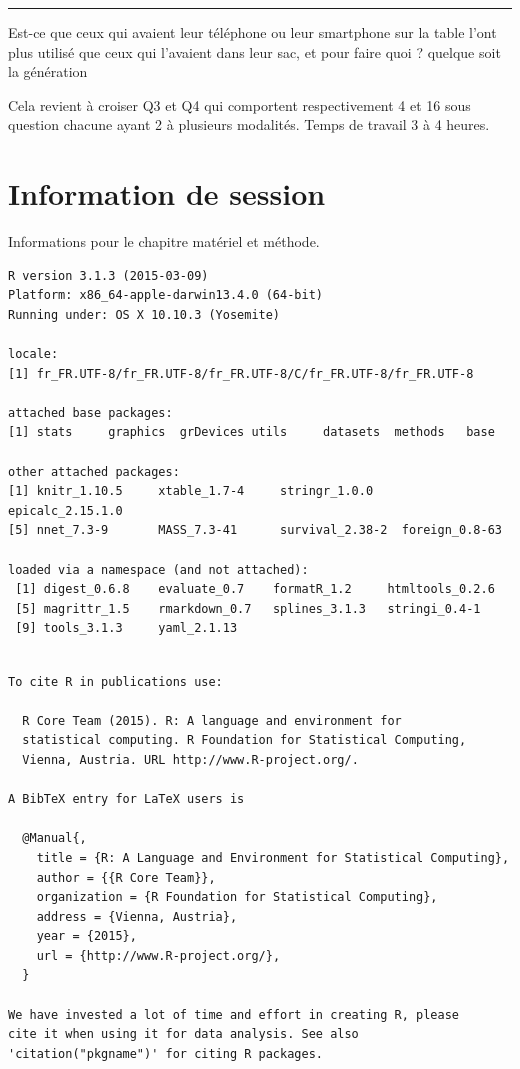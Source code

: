 \documentclass[]{article}
\begin{document}
\begin{center}\rule{3in}{0.4pt}\end{center}

Est-ce que ceux qui avaient leur téléphone ou leur smartphone sur la
table l'ont plus utilisé que ceux qui l'avaient dans leur sac, et pour
faire quoi ? quelque soit la génération

Cela revient à croiser Q3 et Q4 qui comportent respectivement 4 et 16
sous question chacune ayant 2 à plusieurs modalités. Temps de travail 3
à 4 heures.

\section{Information de session}\label{information-de-session}

Informations pour le chapitre matériel et méthode.

\begin{verbatim}
R version 3.1.3 (2015-03-09)
Platform: x86_64-apple-darwin13.4.0 (64-bit)
Running under: OS X 10.10.3 (Yosemite)

locale:
[1] fr_FR.UTF-8/fr_FR.UTF-8/fr_FR.UTF-8/C/fr_FR.UTF-8/fr_FR.UTF-8

attached base packages:
[1] stats     graphics  grDevices utils     datasets  methods   base     

other attached packages:
[1] knitr_1.10.5     xtable_1.7-4     stringr_1.0.0    epicalc_2.15.1.0
[5] nnet_7.3-9       MASS_7.3-41      survival_2.38-2  foreign_0.8-63  

loaded via a namespace (and not attached):
 [1] digest_0.6.8    evaluate_0.7    formatR_1.2     htmltools_0.2.6
 [5] magrittr_1.5    rmarkdown_0.7   splines_3.1.3   stringi_0.4-1  
 [9] tools_3.1.3     yaml_2.1.13    
\end{verbatim}

\begin{verbatim}

To cite R in publications use:

  R Core Team (2015). R: A language and environment for
  statistical computing. R Foundation for Statistical Computing,
  Vienna, Austria. URL http://www.R-project.org/.

A BibTeX entry for LaTeX users is

  @Manual{,
    title = {R: A Language and Environment for Statistical Computing},
    author = {{R Core Team}},
    organization = {R Foundation for Statistical Computing},
    address = {Vienna, Austria},
    year = {2015},
    url = {http://www.R-project.org/},
  }

We have invested a lot of time and effort in creating R, please
cite it when using it for data analysis. See also
'citation("pkgname")' for citing R packages.
\end{verbatim}
\end{document}
